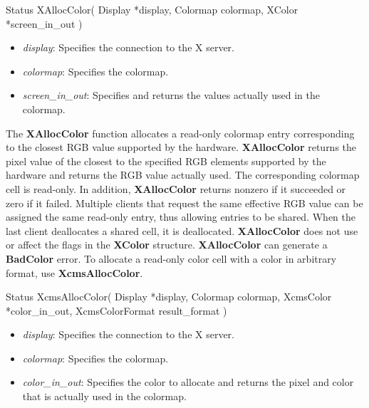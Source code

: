 \documentclass{report}
\begin{document}
\begin{itemize}
\begin{cppcode}
                Status XAllocColor(
                    Display *display,
                    Colormap colormap,
                    XColor *screen_in_out
                )
            \end{cppcode}
            \bigbreak \noindent
            \begin{itemize}
                \item \textit{display}: Specifies the connection to the X server.
                \item \textit{colormap}: Specifies the colormap.
                \item \textit{screen\_in\_out}: Specifies and returns the values actually used in the colormap.
            \end{itemize}
            \noindent
            The \textbf{XAllocColor} function allocates a read-only colormap entry corresponding to the closest RGB value supported by the hardware. \textbf{XAllocColor} returns the pixel value of the closest to the specified RGB elements supported by the hardware and returns the RGB value actually used. The corresponding colormap cell is read-only. In addition, \textbf{XAllocColor} returns nonzero if it succeeded or zero if it failed. Multiple clients that request the same effective RGB value can be assigned the same read-only entry, thus allowing entries to be shared. When the last client deallocates a shared cell, it is deallocated. \textbf{XAllocColor} does not use or affect the flags in the \textbf{XColor} structure.
            \bigbreak \noindent
            \textbf{XAllocColor} can generate a \textbf{BadColor} error.
            \bigbreak \noindent
            To allocate a read-only color cell with a color in arbitrary format, use \textbf{XcmsAllocColor}.
            \bigbreak \noindent
            \begin{cppcode}
                Status XcmsAllocColor(
                    Display *display,
                    Colormap colormap,
                    XcmsColor *color_in_out,
                    XcmsColorFormat result_format
                )
            \end{cppcode}
            \bigbreak \noindent
            \begin{itemize}
                \item \textit{display}: Specifies the connection to the X server.
                \item \textit{colormap}: Specifies the colormap.
                \item \textit{color\_in\_out}: Specifies the color to allocate and returns the pixel and color that is actually used in the colormap.

\end{itemize}
\end{itemize}
\end{document}
